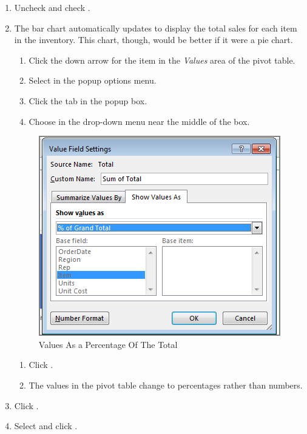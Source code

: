 \begin{enumerate}
	\item Uncheck  and check .
	\item The bar chart automatically updates to display the total sales for each item in the inventory. This chart, though, would be better if it were a pie chart.
	
	\begin{enumerate}
		\item Click the down arrow for the  item in the \textit{Values} area of the pivot table.
		\item Select  in the popup options menu.
		\item Click the  tab in the  popup box.
		\item Choose  in the drop-down menu near the middle of the  box.
\end{enumerate}

\begin{figure}[H]
	\centering
	\includegraphics[width=\maxwidth{.95\linewidth}]{gfx/ch07_fig29}
	\caption{Values As a Percentage Of The Total}
	\label{07:fig29}
\end{figure}

\begin{enumerate}[resume]		
		\item Click .
		\item The values in the pivot table change to percentages rather than numbers.
	\end{enumerate}
	
	\item Click .
	\item Select  and click .
\end{enumerate}

